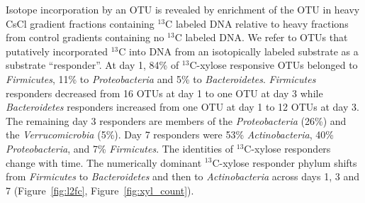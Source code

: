 Isotope incorporation by an OTU is revealed by enrichment of the OTU in heavy
CsCl gradient fractions containing $^{13}$C labeled DNA relative to heavy
fractions from control gradients containing no $^{13}$C labeled DNA. We refer
to OTUs that putatively incorporated $^{13}$C into DNA from an isotopically
labeled substrate as a substrate ``responder''. At day 1, 84\% of $^{13}$C-xylose responsive OTUs belonged to
\textit{Firmicutes}, 11\% to \textit{Proteobacteria} and 5\% to
\textit{Bacteroidetes}. \textit{Firmicutes} responders decreased from 16
OTUs at day 1 to one OTU at day 3 while \textit{Bacteroidetes} responders
increased from one OTU at day 1 to 12 OTUs at day 3. The remaining day 3
responders are members of the \textit{Proteobacteria} (26\%) and the
\textit{Verrucomicrobia} (5\%). Day 7 responders were 53\%
\textit{Actinobacteria}, 40\% \textit{Proteobacteria}, and 7\%
\textit{Firmicutes}. The identities of $^{13}$C-xylose responders change with
time. The numerically dominant $^{13}$C-xylose responder phylum shifts from
\textit{Firmicutes} to \textit{Bacteroidetes} and then to
\textit{Actinobacteria} across days 1, 3 and 7 (Figure~\ref{fig:l2fc},
Figure~\ref{fig:xyl_count}). 

